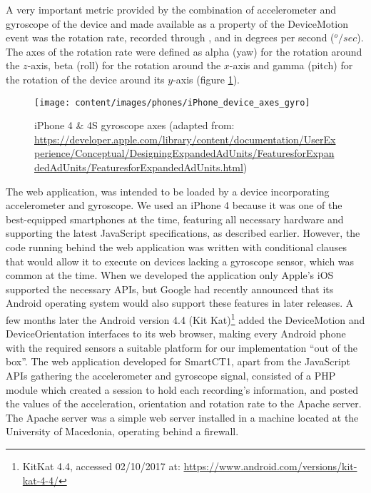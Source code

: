 A very important metric provided by the combination of accelerometer and gyroscope of the device and made available as a property of the DeviceMotion event was the rotation rate, recorded through ,  and  in degrees per second ($^{o}/sec$). The axes of the rotation rate were defined as alpha (yaw) for the rotation around the $z$-axis, beta (roll) for the rotation around the $x$-axis and gamma (pitch) for the rotation of the device around its $y$-axis (figure \ref{fig:iphoneAxesGyro}). 

\begin{figure}[h]
	\centering
	\texttt{[image: content/images/phones/iPhone\_device\_axes\_gyro]}
	\caption{iPhone 4 \& 4S gyroscope axes (adapted from: \url{https://developer.apple.com/library/content/documentation/UserExperience/Conceptual/DesigningExpandedAdUnits/FeaturesforExpandedAdUnits/FeaturesforExpandedAdUnits.html})}
	\label{fig:iphoneAxesGyro}
\end{figure}

The web application, was intended to be loaded by a device incorporating accelerometer and gyroscope. We used an iPhone 4 because it was one of the best-equipped smartphones at the time, featuring all necessary hardware and supporting the latest JavaScript specifications, as described earlier. However, the code running behind the web application was written with conditional clauses that would allow it to execute on devices lacking a gyroscope sensor, which was common at the time. When we developed the application only Apple's iOS supported the necessary \gls{API}s, but Google had recently announced that its Android operating system would also support these features in later releases. A few months later the Android version 4.4 (Kit Kat)\footnote{KitKat 4.4, accessed 02/10/2017 at: \url{https://www.android.com/versions/kit-kat-4-4/}} added the DeviceMotion and DeviceOrientation interfaces to its web browser, making every Android phone with the required sensors a suitable platform for our implementation ``out of the box''. The web application developed for \gls{SmartCT1}, apart from the JavaScript \gls{API}s gathering the accelerometer and gyroscope signal, consisted of a PHP module which created a session to hold each recording's information, and posted the values of the acceleration, orientation and rotation rate to the Apache server. The Apache server was a simple web server installed in a machine located at the University of Macedonia, operating behind a firewall. 

